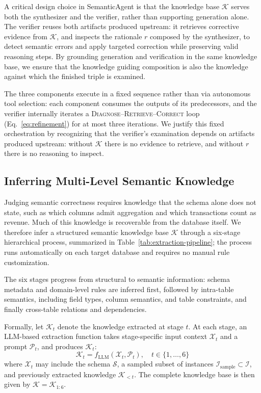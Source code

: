 \documentclass[letterpaper,journal]{IEEEtran}
\begin{document}
A critical design choice in SemanticAgent is that the knowledge base $\mathcal{K}$ serves both the synthesizer and the verifier, rather than supporting generation alone. The verifier reuses both artifacts produced upstream: it retrieves corrective evidence from $\mathcal{K}$, and inspects the rationale $r$ composed by the synthesizer, to detect semantic errors and apply targeted correction while preserving valid reasoning steps. By grounding generation and verification in the same knowledge base, we ensure that the knowledge guiding composition is also the knowledge against which the finished triple is examined.

The three components execute in a fixed sequence rather than via autonomous tool selection: each component consumes the outputs of its predecessors, and the verifier internally iterates a \textsc{Diagnose}--\textsc{Retrieve}--\textsc{Correct} loop (Eq.~\ref{eq:refinement}) for at most three iterations. We justify this fixed orchestration by recognizing that the verifier's examination depends on artifacts produced upstream: without $\mathcal{K}$ there is no evidence to retrieve, and without $r$ there is no reasoning to inspect.

\subsection{Inferring Multi-Level Semantic Knowledge}
\label{subsec:semantic-construction}

Judging semantic correctness requires knowledge that the schema alone does not state, such as which columns admit aggregation and which transactions count as revenue. Much of this knowledge is recoverable from the database itself. We therefore infer a structured semantic knowledge base $\mathcal{K}$ through a six-stage hierarchical process, summarized in Table~\ref{tab:extraction-pipeline}; the process runs automatically on each target database and requires no manual rule customization.

The six stages progress from structural to semantic information: schema metadata and domain-level rules are inferred first, followed by intra-table semantics, including field types, column semantics, and table constraints, and finally cross-table relations and dependencies.

Formally, let $\mathcal{K}_t$ denote the knowledge extracted at stage $t$. At each stage, an LLM-based extraction function takes stage-specific input context $\mathcal{X}_t$ and a prompt $\mathcal{P}_t$, and produces $\mathcal{K}_t$:
\begin{equation}
\mathcal{K}_t = f_{\text{LLM}}(\mathcal{X}_t, \mathcal{P}_t), \quad t \in \{1,\ldots,6\}
\end{equation}
where $\mathcal{X}_t$ may include the schema $\mathcal{S}$, a sampled subset of instances $\mathcal{I}_{\text{sample}} \subset \mathcal{I}$, and previously extracted knowledge $\mathcal{K}_{<t}$. The complete knowledge base is then given by $\mathcal{K} = \mathcal{K}_{1:6}$.
\end{document}
